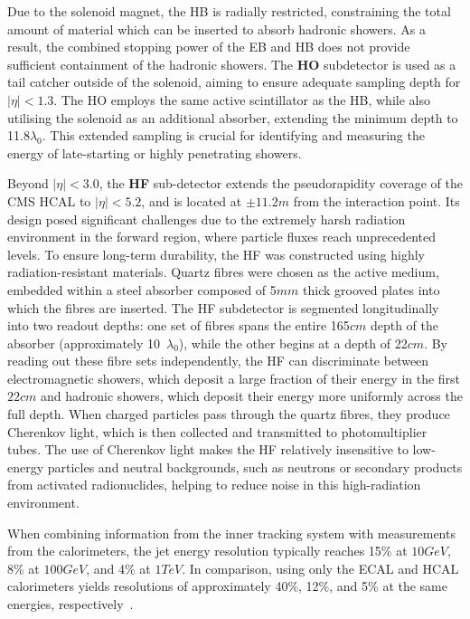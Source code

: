 Due to the solenoid magnet, the HB is radially restricted, constraining the total amount of material which can be inserted to absorb hadronic showers. As a result, the combined stopping power of the EB and HB does not provide sufficient containment of the hadronic showers. The \textbf{HO} subdetector is used as a tail catcher outside of the solenoid, aiming to ensure adequate sampling depth for $|\eta| < 1.3$. The HO employs the same active scintillator as the HB, while also utilising the solenoid as an additional absorber, extending the minimum depth to 11.8$\lambda_0$. This extended sampling is crucial for identifying and measuring the energy of late-starting or highly penetrating showers.

Beyond $|\eta| < 3.0$, the \textbf{HF} sub-detector extends the pseudorapidity coverage of the CMS HCAL to $|\eta| < 5.2$, and is located at $\pm 11.2\unit{m}$ from the interaction point. Its design posed significant challenges due to the extremely harsh radiation environment in the forward region, where particle fluxes reach unprecedented levels. To ensure long-term durability, the HF was constructed using highly radiation-resistant materials. Quartz fibres were chosen as the active medium, embedded within a steel absorber composed of 5$\unit{mm}$ thick grooved plates into which the fibres are inserted. The HF subdetector is segmented longitudinally into two readout depths: one set of fibres spans the entire 165$\unit{cm}$ depth of the absorber (approximately 10~$\lambda_0$), while the other begins at a depth of 22$\unit{cm}$. By reading out these fibre sets independently, the HF can discriminate between electromagnetic showers, which deposit a large fraction of their energy in the first $22\unit{cm}$ and hadronic showers, which deposit their energy more uniformly across the full depth. When charged particles pass through the quartz fibres, they produce Cherenkov light, which is then collected and transmitted to photomultiplier tubes. The use of Cherenkov light makes the HF relatively insensitive to low-energy particles and neutral backgrounds, such as neutrons or secondary products from activated radionuclides, helping to reduce noise in this high-radiation environment.

When combining information from the inner tracking system with measurements from the calorimeters, the jet energy resolution typically reaches 15\% at $10\unit{GeV}$, 8\% at $100\unit{GeV}$, and 4\% at $1\unit{TeV}$. In comparison, using only the ECAL and HCAL calorimeters yields resolutions of approximately 40\%, 12\%, and 5\% at the same energies, respectively~\cite{CMS_HCAL_EnergyResolution}.

